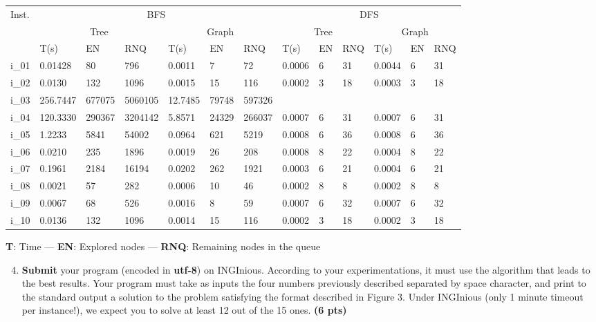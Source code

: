 \documentclass[11pt,a4paper]{../template/report}
\begin{document}
\begin{answers}[7cm]
\small
\begin{center}
\begin{tabular}{||l|l|l|l|l|l|l|l|l|l|l|l|l||}
\hline
\multirow{3}{*}{Inst.} & \multicolumn{6}{c|}{BFS} & \multicolumn{6}{c||}{DFS} \\
\cline{2-13}
& \multicolumn{3}{c|}{Tree} & \multicolumn{3}{c|}{Graph} & \multicolumn{3}{c|}{Tree} & \multicolumn{3}{c||}{Graph}\\
\cline{2-13}
 & T(s) & EN & RNQ & T(s) & EN & RNQ & T(s) & EN & RNQ & T(s) & EN & RNQ\\
\hline
i\_01 &  0.01428 &80 & 796 &0.0011 &7 &72 &0.0006 &6 &31 &0.0044 &6 &31 \\
\hline
i\_02 & 0.0130& 132&1096 &  0.0015&15 &116 &0.0002 &3 &18 &0.0003 &3 &18 \\
\hline
i\_03 &256.7447 &677075 &5060105 &12.7485 &79748 &597326 & & & & & & \\
\hline
i\_04 &120.3330 &290367 &3204142 &5.8571 &24329 &266037 &0.0007 &6 &31 &0.0007 &6 &31 \\
\hline
i\_05 &1.2233 &5841 &54002 &0.0964 &621 &5219 & 0.0008&6 &36 & 0.0008&6 &36 \\
\hline
i\_06 & 0.0210&235 &1896 &0.0019 &26 &208 & 0.0008&8 &22 &0.0004 &8 &22 \\
\hline
i\_07 & 0.1961&2184 &16194 &0.0202 &262 &1921 &0.0003 &6 &21 & 0.0004&6 &21 \\
\hline
i\_08 & 0.0021&57 &282 &0.0006 &10 &46 &0.0002 &8 &8 & 0.0002&8 &8 \\
\hline
i\_09 & 0.0067& 68&526 &0.0016 &8 &59 &0.0007 &6 &32 &0.0007 &6 &32 \\
\hline
i\_10 & 0.0136& 132 &1096 &0.0014 &15 &116 &0.0002 &3 &18 &0.0002 &3 &18 \\
\hline
\end{tabular}
\end{center}
\textbf{T}: Time — \textbf{EN}: Explored nodes —
\textbf{RNQ}: Remaining nodes in the queue
\end{answers}



\begin{enumerate}
\setcounter{enumi}{3}
    \item \textbf{Submit} your program (encoded in \textbf{utf-8}) on INGInious. According to your experimentations, it must use the algorithm that leads to the best results. Your program must take as inputs the four numbers previously described separated by space character, and print to the standard output a solution to the problem satisfying the format described in Figure 3. Under INGInious (only 1 minute timeout per instance!), we expect you to solve at least 12 out of the 15 ones. \textbf{(6 pts)}
\end{enumerate}
\end{document}
